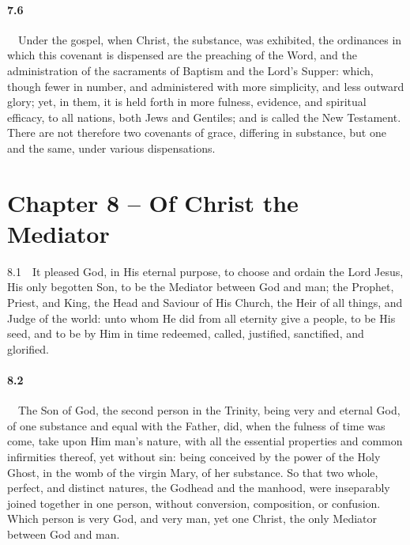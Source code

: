 \paragraph{7.6}\ \ Under the gospel, when Christ, the substance, was exhibited, the ordinances in which this covenant is dispensed are the preaching of the Word, and the administration of the sacraments of Baptism and the Lord's Supper: which, though fewer in number, and administered with more simplicity, and less outward glory; yet, in them, it is held forth in more fulness, evidence, and spiritual efficacy, to all nations, both Jews and Gentiles; and is called the New Testament. There are not therefore two covenants of grace, differing in substance, but one and the same, under various dispensations.  

\section{Chapter 8 -- Of Christ the Mediator} 8.1\ \ It pleased God, in His eternal purpose, to choose and ordain the Lord Jesus, His only begotten Son, to be the Mediator between God and man; the Prophet, Priest, and King, the Head and Saviour of His Church, the Heir of all things, and Judge of the world: unto whom He did from all eternity give a people, to be His seed, and to be by Him in time redeemed, called, justified, sanctified, and glorified.   
\bigskip
\paragraph{8.2}\ \ The Son of God, the second person in the Trinity, being very and eternal God, of one substance and equal with the Father, did, when the fulness of time was come, take upon Him man's nature, with all the essential properties and common infirmities thereof, yet without sin: being conceived by the power of the Holy Ghost, in the womb of the virgin Mary, of her substance. So that two whole, perfect, and distinct natures, the Godhead and the manhood, were inseparably joined together in one person, without conversion, composition, or confusion. Which person is very God, and very man, yet one Christ, the only Mediator between God and man.   
\bigskip

